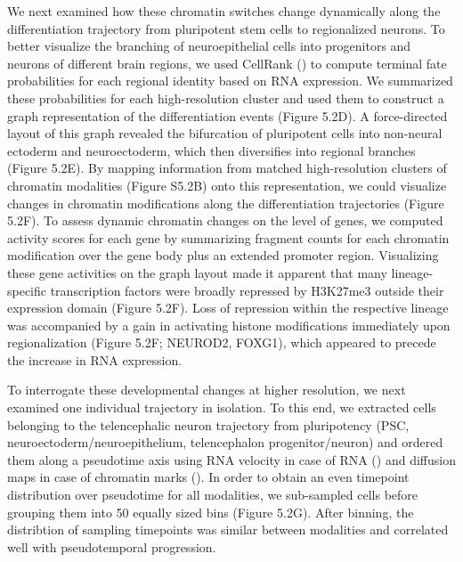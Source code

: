 We next examined how these chromatin switches change dynamically along the differentiation trajectory from pluripotent stem cells to regionalized neurons. To better visualize the branching of neuroepithelial cells into progenitors and neurons of different brain regions, we used CellRank (\cite{lange_cellrank_2022}) to compute terminal fate probabilities for each regional identity based on RNA expression. We summarized these probabilities for each high-resolution cluster and used them to construct a graph representation of the differentiation events (Figure 5.2D). A force-directed layout of this graph revealed the bifurcation of pluripotent cells into non-neural ectoderm and neuroectoderm, which then diversifies into regional branches (Figure 5.2E). By mapping information from matched high-resolution clusters of chromatin modalities (Figure S5.2B) onto this representation, we could visualize changes in chromatin modifications along the differentiation trajectories (Figure 5.2F). To assess dynamic chromatin changes on the level of genes, we computed activity scores for each gene by summarizing fragment counts for each chromatin modification over the gene body plus an extended promoter region. Visualizing these gene activities on the graph layout made it apparent that many lineage-specific transcription factors were broadly repressed by H3K27me3 outside their expression domain (Figure 5.2F). 
Loss of repression within the respective lineage was accompanied by a gain in activating histone modifications immediately upon regionalization (Figure 5.2F; NEUROD2, FOXG1), which appeared to precede the increase in RNA expression.

To interrogate these developmental changes at higher resolution, we next examined one individual trajectory in isolation. To this end, we extracted cells belonging to the telencephalic neuron trajectory from pluripotency (PSC, neuroectoderm/neuroepithelium, telencephalon progenitor/neuron) and ordered them along a pseudotime axis using RNA velocity in case of RNA (\cite{bergen_generalizing_2020}) and diffusion maps in case of chromatin marks (\cite{haghverdi_diffusion_2016}). In order to obtain an even timepoint distribution over pseudotime for all modalities, we sub-sampled cells before grouping them into 50 equally sized bins (Figure 5.2G). After binning, the distribtion of sampling timepoints was similar between modalities and correlated well with pseudotemporal progression. 

